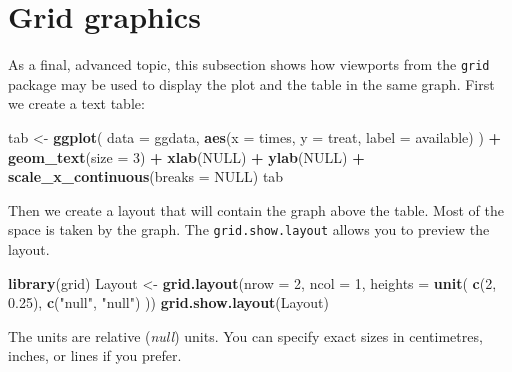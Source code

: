 \documentclass[
]{book}
\newenvironment{Shaded}{\begin{snugshade}}{\end{snugshade}}
\newcommand{\AttributeTok}[1]{\textcolor[rgb]{0.13,0.29,0.53}{#1}}
\newcommand{\ConstantTok}[1]{\textcolor[rgb]{0.56,0.35,0.01}{#1}}
\newcommand{\DecValTok}[1]{\textcolor[rgb]{0.00,0.00,0.81}{#1}}
\newcommand{\FloatTok}[1]{\textcolor[rgb]{0.00,0.00,0.81}{#1}}
\newcommand{\FunctionTok}[1]{\textcolor[rgb]{0.13,0.29,0.53}{\textbf{#1}}}
\newcommand{\NormalTok}[1]{#1}
\newcommand{\OtherTok}[1]{\textcolor[rgb]{0.56,0.35,0.01}{#1}}
\newcommand{\SpecialCharTok}[1]{\textcolor[rgb]{0.81,0.36,0.00}{\textbf{#1}}}
\newcommand{\StringTok}[1]{\textcolor[rgb]{0.31,0.60,0.02}{#1}}
\begin{document}
\section{Grid graphics}\label{grid-graphics}

As a final, advanced topic, this subsection shows how viewports from
the \texttt{grid} package may be used to display the plot and the
table in the same graph. First we create a text table:

\begin{Shaded}
\begin{Highlighting}[]
\NormalTok{tab }\OtherTok{\textless{}{-}} 
  \FunctionTok{ggplot}\NormalTok{(}
    \AttributeTok{data =}\NormalTok{ ggdata, }
    \FunctionTok{aes}\NormalTok{(}\AttributeTok{x =}\NormalTok{ times, }\AttributeTok{y =}\NormalTok{ treat, }\AttributeTok{label =}\NormalTok{ available)}
\NormalTok{  ) }\SpecialCharTok{+}
  \FunctionTok{geom\_text}\NormalTok{(}\AttributeTok{size =} \DecValTok{3}\NormalTok{) }\SpecialCharTok{+}
  \FunctionTok{xlab}\NormalTok{(}\ConstantTok{NULL}\NormalTok{) }\SpecialCharTok{+}
  \FunctionTok{ylab}\NormalTok{(}\ConstantTok{NULL}\NormalTok{) }\SpecialCharTok{+}
  \FunctionTok{scale\_x\_continuous}\NormalTok{(}\AttributeTok{breaks =} \ConstantTok{NULL}\NormalTok{)}
\NormalTok{tab}
\end{Highlighting}
\end{Shaded}

Then we create a layout that will contain the graph above the
table. Most of the space is taken by the graph. The
\texttt{grid.show.layout} allows you to preview the layout.

\begin{Shaded}
\begin{Highlighting}[]
\FunctionTok{library}\NormalTok{(grid)}
\NormalTok{Layout }\OtherTok{\textless{}{-}} \FunctionTok{grid.layout}\NormalTok{(}\AttributeTok{nrow =} \DecValTok{2}\NormalTok{, }\AttributeTok{ncol =} \DecValTok{1}\NormalTok{, }\AttributeTok{heights =} \FunctionTok{unit}\NormalTok{(}
  \FunctionTok{c}\NormalTok{(}\DecValTok{2}\NormalTok{, }\FloatTok{0.25}\NormalTok{),}
  \FunctionTok{c}\NormalTok{(}\StringTok{"null"}\NormalTok{, }\StringTok{"null"}\NormalTok{)}
\NormalTok{))}
\FunctionTok{grid.show.layout}\NormalTok{(Layout)}
\end{Highlighting}
\end{Shaded}

The units are relative (\emph{null}) units. You can specify exact sizes
in centimetres, inches, or lines if you prefer.
\end{document}

